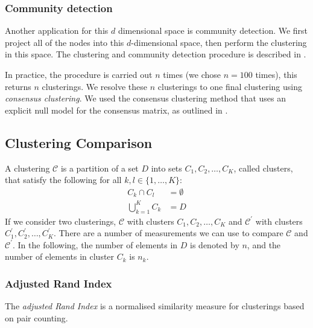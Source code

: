 \documentclass[a4paper,12pt]{article}
\theoremstyle{definition}
\begin{document}
        \subsubsection{Community detection}
        Another application for this $d$ dimensional space is community detection. We first project all of the nodes into this $d$-dimensional space, then perform the clustering in this space. The clustering and community detection procedure is described in \cite{humphries2}. 

        In practice, the procedure is carried out $n$ times (we chose $n=100$ times), this returns $n$ clusterings. We resolve these $n$ clusterings to one final clustering using \textit{consensus clustering}. We used the consensus clustering method that uses an explicit null model for the consensus matrix, as outlined in \cite{humphries}.

    \subsection{Clustering Comparison}
    A clustering $\mathcal{C}$ is a partition of a set $D$ into sets $C_1, C_2, \dots, C_K$, called clusters, that satisfy the following for all $k,l \in \lbrace 1,\dots,K \rbrace$:
    \begin{align}
        C_k \cap C_l &= \emptyset \\
        \bigcup_{k=1}^K C_k &= D
    \end{align}
    If we consider two clusterings, $\mathcal{C}$ with clusters $C_1, C_2, \dots, C_K$ and $\mathcal{C}^{\prime}$ with clusters $C_1^{\prime}, C_2^{\prime}, \dots, C_K^{\prime}$. There are a number of measurements we can use to compare $\mathcal{C}$ and $\mathcal{C}^{\prime}$. In the following, the number of elements in $D$ is denoted by $n$, and the number of elements in cluster $C_k$ is $n_k$.

      \subsubsection{Adjusted Rand Index}
      The \textit{adjusted Rand Index} is a normalised similarity measure for clusterings based on pair counting.
\end{document}
